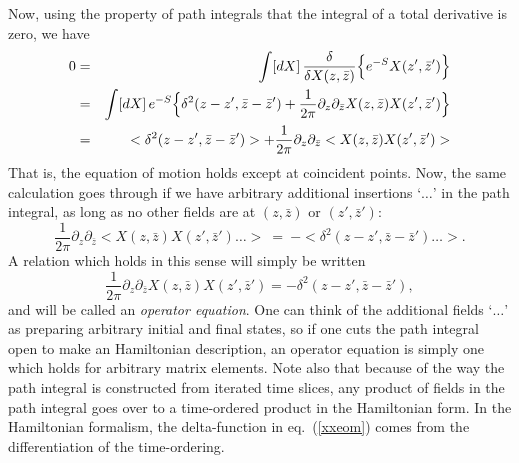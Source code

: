 Now, using the property of path integrals that the integral of a
total derivative is zero, we have
\begin{eqnarray}
0 &=& \int [dX]\,\frac{\delta}{\delta X(z,\bar z) }
\Bigl\{ e^{-S} X(z',\bar z') \Bigr\} \nonumber\\
&=& \int [dX]\,
e^{-S} \Bigl\{ \delta^2(z-z',\bar z - \bar z') + \frac{1}{2\pi}
\partial_z \partial_{\bar z} X(z,\bar z)  X(z',\bar z') 
\Bigr\}\nonumber\\
&=&
< \delta^2(z-z',\bar z - \bar z') > + \frac{1}{2\pi} \partial_z
\partial_{\bar z} < X(z,\bar z)  X(z',\bar z') >
\end{eqnarray}
That is, the equation of motion holds except at coincident
points.  Now, the same
calculation goes through if we have arbitrary additional insertions
`$\ldots$' in the path integral, as long as no other fields are at
$(z,\bar z)$ or
$(z',\bar z')$:
\begin{equation}
\frac{1}{2\pi} \partial_z
\partial_{\bar z} < X(z,\bar z)  X(z',\bar z') \ldots >
\ =\ -< \delta^2(z-z',\bar z - \bar z') \ldots >.
\end{equation}
A relation which holds in this sense will simply be written
\begin{equation}
\frac{1}{2\pi} \partial_z
\partial_{\bar z} X(z,\bar z)  X(z',\bar z')
= -\delta^2(z-z',\bar z - \bar z') , \label{xxeom}
\end{equation}
and will be called an {\it operator equation}.  One can think of
the additional fields `$\ldots$' as preparing arbitrary initial
and final states, so if one cuts the path integral open to make an
Hamiltonian description, an operator equation is simply one which
holds for arbitrary matrix elements.  Note also that because of the
way the path integral is constructed from iterated time slices,
any product of fields in the path integral goes over to a
time-ordered product in the Hamiltonian form.  In the
Hamiltonian formalism, the delta-function in eq.~(\ref{xxeom})
comes from the differentiation of the time-ordering.

